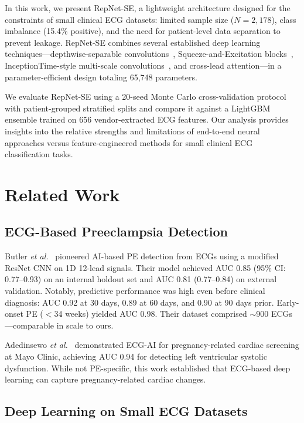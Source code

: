 \documentclass[11pt,a4paper]{article}
\newcommand{\etal}{\textit{et al.}}
\begin{document}
In this work, we present RepNet-SE, a lightweight architecture designed for the constraints of small clinical ECG datasets: limited sample size ($N = 2{,}178$), class imbalance (15.4\% positive), and the need for patient-level data separation to prevent leakage. RepNet-SE combines several established deep learning techniques---depthwise-separable convolutions~\cite{chollet2017}, Squeeze-and-Excitation blocks~\cite{hu2018}, InceptionTime-style multi-scale convolutions~\cite{ismail2020}, and cross-lead attention---in a parameter-efficient design totaling 65,748 parameters.

We evaluate RepNet-SE using a 20-seed Monte Carlo cross-validation protocol with patient-grouped stratified splits and compare it against a LightGBM~\cite{ke2017} ensemble trained on 656 vendor-extracted ECG features. Our analysis provides insights into the relative strengths and limitations of end-to-end neural approaches versus feature-engineered methods for small clinical ECG classification tasks.

\section{Related Work}
\label{sec:related}

\subsection{ECG-Based Preeclampsia Detection}

Butler \etal~\cite{butler2024} pioneered AI-based PE detection from ECGs using a modified ResNet CNN on 1D 12-lead signals. Their model achieved AUC 0.85 (95\% CI: 0.77--0.93) on an internal holdout set and AUC 0.81 (0.77--0.84) on external validation. Notably, predictive performance was high even before clinical diagnosis: AUC 0.92 at 30 days, 0.89 at 60 days, and 0.90 at 90 days prior. Early-onset PE ($<$34 weeks) yielded AUC 0.98. Their dataset comprised $\sim$900 ECGs---comparable in scale to ours.

Adedinsewo \etal~\cite{adedinsewo2021} demonstrated ECG-AI for pregnancy-related cardiac screening at Mayo Clinic, achieving AUC 0.94 for detecting left ventricular systolic dysfunction. While not PE-specific, this work established that ECG-based deep learning can capture pregnancy-related cardiac changes.

\subsection{Deep Learning on Small ECG Datasets}
\end{document}

